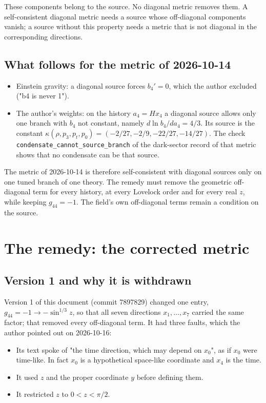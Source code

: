\documentclass[11pt]{article}
\begin{document}
These components belong to the source. No diagonal metric removes them. A self-consistent diagonal metric needs a source whose off-diagonal components vanish; a source without this property needs a metric that is not diagonal in the corresponding directions.

\subsection{What follows for the metric of 2026-10-14}

\begin{itemize}
\item Einstein gravity: a diagonal source forces $b_4' = 0$, which the author excluded ("b4 is never 1").
\item The author's weights: on the history $a_4 = Hx_4$ a diagonal source allows only one branch with $b_4$ not constant, namely $d\ln b_4/da_4 = 4/3$. Its source is the constant $\kappa(\rho, p_3, p_t, p_0) = (-2/27, -2/9, -22/27, -14/27)$. The check \texttt{condensa\allowbreak{}te\_canno\allowbreak{}t\_source\allowbreak{}\_branch} of the dark-sector record of that metric shows that no condensate can be that source.
\end{itemize}

The metric of 2026-10-14 is therefore self-consistent with diagonal sources only on one tuned branch of one theory. The remedy must remove the geometric off-diagonal term for every history, at every Lovelock order and for every real $z$, while keeping $g_{44} = -1$. The field's own off-diagonal terms remain a condition on the source.

\section{The remedy: the corrected metric}

\subsection{Version 1 and why it is withdrawn}

Version 1 of this document (commit 7897829) changed one entry, $g_{44} = -1 \to -\sin^{1/3}z$, so that all seven directions $x_1, \dots, x_7$ carried the same factor; that removed every off-diagonal term. It had three faults, which the author pointed out on 2026-10-16:

\begin{itemize}
\item Its text spoke of "the time direction, which may depend on $x_0$", as if $x_0$ were time-like. In fact $x_0$ is a hypothetical space-like coordinate and $x_4$ is the time.
\item It used $z$ and the proper coordinate $y$ before defining them.
\item It restricted $z$ to $0 < z < \pi/2$.
\end{itemize}
\end{document}
